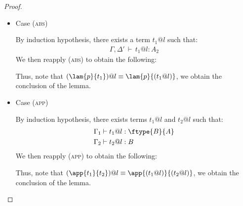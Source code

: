 \begin{proof}
\begin{itemize}
\item Case (\textsc{abs})
\begin{center}
    \begin{minipage}{.55\linewidth}
    \end{minipage}
\end{center}
By induction hypothesis, there exists a term $t_1@l$ such that:
\begin{align*}
\Gamma, \Delta' \,\vdash\, t_1@l : A_2
\end{align*}
We then reapply (\textsc{abs}) to obtain the following:
\begin{center}
    \begin{minipage}{.65\linewidth}
    \end{minipage}
\end{center}
Thus, note that $(\lam{p}{t_1})@l \equiv \lam{p}{(t_1@l)}$, we obtain the conclusion of the lemma.
\\

\item Case (\textsc{app})
\begin{center}
    \begin{minipage}{.65\linewidth}
    \end{minipage}
\end{center}
By induction hypothesis, there exists terms $t_1@l$ and $t_2@l$ such that:
\begin{align*}
\Gamma_1 &\vdash t_1@l : \ftype{B}{A}\\
\Gamma_2 &\vdash t_2@l : B
\end{align*}
We then reapply (\textsc{app}) to obtain the following:
\begin{center}
    \begin{minipage}{.7\linewidth}
    \end{minipage}
\end{center}
Thus, note that $(\app{t_1}{t_2})@l \equiv \app{(t_1@l)}{(t_2@l)}$, we obtain the conclusion of the lemma.
\\


\end{itemize}
\end{proof}
